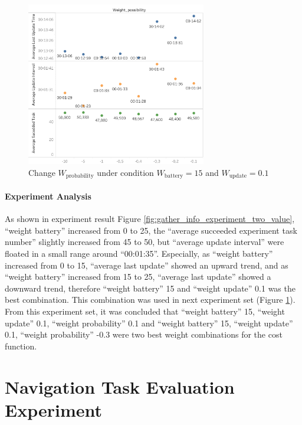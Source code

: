 \begin{figure}[htbp]
 \centering
 \includegraphics[width = 0.7\textwidth]{content/images/ch5/gather_info_change_weight_probability_only.png}
 \caption{ Change $W_{\mbox{probability}}$ under condition $W_{\mbox{battery}}=15$ and $ W_{\mbox{update}}=0.1$}
 \label{fig:gather_info_experiment_three_value}
\end{figure}

\paragraph{Experiment Analysis} 
As shown in experiment result Figure \ref{fig:gather_info_experiment_two_value}, ``weight battery'' increased from 0 to 25, the ``average succeeded experiment task number'' slightly increased from 45 to 50, but ``average update interval'' were floated in a small range around ``00:01:35''. Especially, as ``weight battery'' increased from 0 to 15, ``average last update'' showed an upward trend, and as ``weight battery'' increased from 15 to 25, ``average last update'' showed a downward trend, 
therefore ``weight battery'' 15 and ``weight update'' 0.1 was the best combination. 
This combination was used in next experiment set (Figure \ref{fig:gather_info_experiment_three_value}). From this experiment set, it was concluded that ``weight battery'' 15, ``weight update'' 0.1, ``weight probability'' 0.1 and ``weight battery'' 15, ``weight update'' 0.1, ``weight probability'' -0.3 were two best weight combinations for the cost function.

\section{Navigation Task Evaluation Experiment}
\label{sec:navigation_task_experiments}


